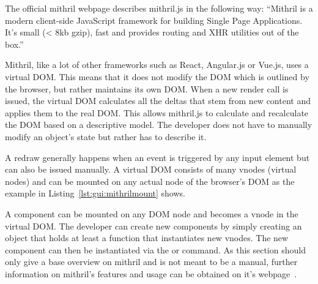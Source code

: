 The   official  mithril   webpage  describes   mithril.js  in   the  following
way: ``Mithril  is  a modern  client-side  JavaScript  framework for  building
Single Page Applications. It's  small (< 8kb gzip), fast  and provides routing
and XHR utilities out of the box.''~\cite{mithril:home}

Mithril, like a  lot of other frameworks such as  React, Angular.js or Vue.js,
uses  a virtual  DOM. This means  that it  does not  modify the  DOM which  is
outlined by the  browser, but rather maintains its own  DOM. When a new render
call is issued, the  virtual DOM calculates all the deltas  that stem from new
content and applies them to the  real DOM. This allows mithril.js to calculate
and recalculate the DOM based on  a descriptive model.  The developer does not
have to manually modify an object's state but rather has to describe it.

A redraw generally happens when an event is triggered by any input element but
can also be  issued manually.  A virtual DOM consists  of many vnodes (virtual
nodes) and  can be  mounted on  any actual node  of the  browser's DOM  as the
example in Listing~\ref{lst:gui:mithrilmount} shows.


A component can be mounted on any DOM  node and becomes a vnode in the virtual
DOM. The developer can create new components by simply creating an object that
holds at least a  function that instantiates new vnodes.  The new
component  can then  be instantiated  via the   or  
command.  As this section  should only give a base overview  on mithril and is
not meant to be a manual,  further information on mithril's features and usage
can be obtained on it's webpage~\cite{mithril:home}.
%
%
